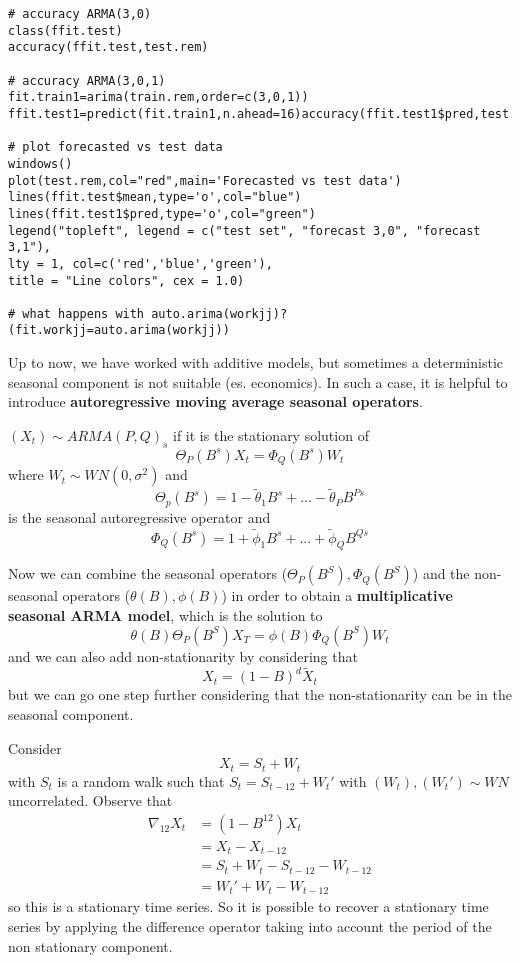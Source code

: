 \begin{example}
\begin{verbatim}
# accuracy ARMA(3,0)
class(ffit.test)
accuracy(ffit.test,test.rem)

# accuracy ARMA(3,0,1)
fit.train1=arima(train.rem,order=c(3,0,1))
ffit.test1=predict(fit.train1,n.ahead=16)accuracy(ffit.test1$pred,test.rem)

# plot forecasted vs test data
windows()
plot(test.rem,col="red",main='Forecasted vs test data')
lines(ffit.test$mean,type='o',col="blue")
lines(ffit.test1$pred,type='o',col="green")
legend("topleft", legend = c("test set", "forecast 3,0", "forecast 3,1"),
lty = 1, col=c('red','blue','green'),
title = "Line colors", cex = 1.0)

# what happens with auto.arima(workjj)?
(fit.workjj=auto.arima(workjj))
    \end{verbatim}
\end{example}

Up to now, we have worked with additive models, but sometimes a deterministic seasonal component is not suitable (es. economics). In such a case, it is helpful to introduce \textbf{autoregressive moving average seasonal operators}.

\begin{definition}
    $(X_t)\sim ARMA(P,Q)_s$ if it is the stationary solution of
    \[
        \Theta_P(B^s)X_t=\Phi_Q(B^s)W_t  
    \]
    where $W_t\sim WN(0,\sigma^2)$ and
    \[
      \Theta_p(B^s)=1-\tilde{\theta}_1B^s+...-\tilde{\theta}_PB^{Ps}
    \]
    is the seasonal autoregressive operator and
    \[
        \Phi_Q(B^s)=1+\tilde{\phi}_1B^s+...+\tilde{\phi}_QB^{Qs}
    \]
\end{definition}

Now we can combine the seasonal operators ($\Theta_P(B^S),\Phi_Q(B^S)$) and the non-seasonal operators ($\theta(B),\phi(B)$) in order to obtain a \textbf{multiplicative seasonal ARMA model}, which is the solution to
\[
    \theta(B)\Theta_P(B^S)X_T=\phi(B)\Phi_Q(B^S)W_t
\]
and we can also add non-stationarity by considering that
\[
    X_t=(1-B)^d\tilde{X}_t  
\]
but we can go one step further considering that the non-stationarity can be in the seasonal component.

\begin{example}
    Consider
    \[
        X_t=S_t+W_t  
    \]
    with $S_t$ is a random walk such that $S_t=S_{t-12}+W_t'$ with $(W_t),(W_t')\sim WN$ uncorrelated. Observe that
    \begin{equation*}
        \begin{split}
            \nabla_{12}X_t&=(1-B^{12})X_t\\
            &=X_t-X_{t-12}\\
            &=S_t+W_t-S_{t-12}-W_{t-12}\\
            &=W_t'+W_t-W_{t-12}
        \end{split}
    \end{equation*}
    so this is a stationary time series. So it is possible to recover a stationary time series by applying the difference operator taking into account the period of the non stationary component.
\end{example}

